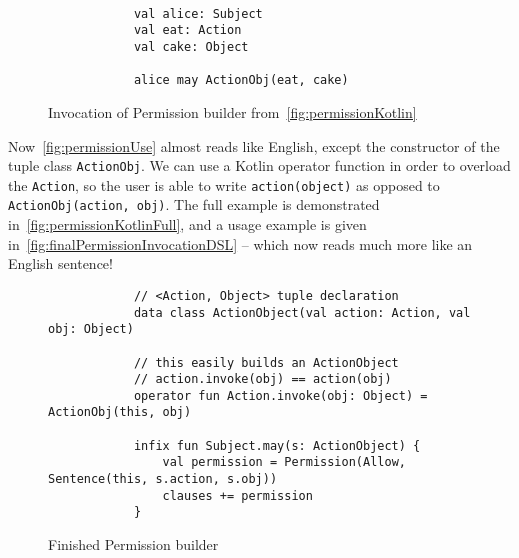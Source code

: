 \begin{figure}[h]
    \centering
    \begin{minipage}{0.5\textwidth}
        \begin{verbatim}

            val alice: Subject
            val eat: Action
            val cake: Object

            alice may ActionObj(eat, cake)
        \end{verbatim}
    \end{minipage}
    \caption{Invocation of Permission builder from~\autoref{fig:permissionKotlin}}
    \label{fig:permissionUse}
\end{figure}

Now~\autoref{fig:permissionUse} almost reads like English, except the constructor of the tuple class \texttt{ActionObj}.
We can use a Kotlin operator function in order to overload the \texttt{Action}, so the user is able to write \texttt{action(object)} as opposed to \texttt{ActionObj(action, obj)}.
The full example is demonstrated in~\autoref{fig:permissionKotlinFull}, and a usage example is given in~\autoref{fig:finalPermissionInvocationDSL} -- which now reads much more like an English sentence!


\begin{figure}[h]
    \centering
    \begin{minipage}{\textwidth}
        \begin{verbatim}
            // <Action, Object> tuple declaration
            data class ActionObject(val action: Action, val obj: Object)

            // this easily builds an ActionObject
            // action.invoke(obj) == action(obj)
            operator fun Action.invoke(obj: Object) = ActionObj(this, obj)

            infix fun Subject.may(s: ActionObject) {
                val permission = Permission(Allow, Sentence(this, s.action, s.obj))
                clauses += permission
            }
        \end{verbatim}
    \end{minipage}
    \caption{Finished Permission builder}
    \label{fig:permissionKotlinFull}
\end{figure}



